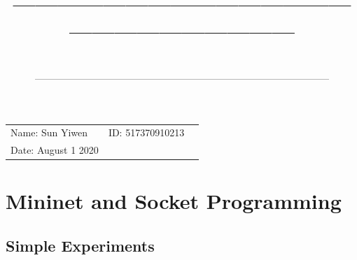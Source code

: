 \documentclass[a4paper]{article}
\title{—————————————————————————\\ \sc{UM-SJTU Joint Institute}}
\author{\sc{Computer Networks}}
\date{\sc{(Ve489)}\\——————————————————————————————}
\begin{document}
\maketitle
\vspace{5cm}
\centerline{\Large{}}
\vspace{9cm}
\begin{tabular}{lll}
\qquad \qquad Name: Sun Yiwen&ID: 517370910213\\
\qquad \qquad Date: August 1 2020
\end{tabular}

\newpage
\section{Mininet and Socket Programming}
\subsection{Simple Experiments}
\end{document}
